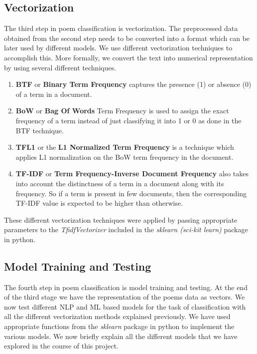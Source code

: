 \documentclass[11pt,a4paper]{article}
\begin{document}
\subsection{Vectorization}
The third step in poem classification is vectorization. The preprocessed data obtained from the second step needs to be converted into a format which can be later used by different models. We use different vectorization techniques to accomplish this. More formally, we convert the text into numerical representation by using several different techniques. 
\begin{enumerate}
    \item \textbf{BTF} or \textbf{Binary Term Frequency} captures the presence (1) or absence (0) of a term in a document.
    \vspace{-0.2cm}\item \textbf{BoW} or \textbf{Bag Of Words} Term Frequency is used to assign the exact frequency of a term instead of just classifying it into 1 or 0 as done in the BTF technique.
    \vspace{-0.2cm}\item \textbf{TFL1} or the \textbf{L1 Normalized Term Frequency} is a technique which applies L1 normalization on the BoW term frequency in the document.
    \vspace{-0.2cm}\item \textbf{TF-IDF} or \textbf{Term Frequency-Inverse Document Frequency} also takes into account the distinctness of a term in a document along with its frequency. So if a term is present in few documents, then the corresponding TF-IDF value is expected to be higher than otherwise.
\end{enumerate}
These different vectorization techniques were applied by passing appropriate parameters to the \textit{TfidfVectorizer} included in the \textit{sklearn (sci-kit learn)} package in python.

\subsection{Model Training and Testing}
The fourth step in poem classification is model training and testing. At the end of the third stage we have the representation of the poems data as vectors. We now test different NLP and ML based models for the task of classification with all the different vectorization methods explained previously. We have used appropriate functions from the \textit{sklearn} package in python to implement the various models. We now briefly explain all the different models that we have explored in the course of this project.
\end{document}

